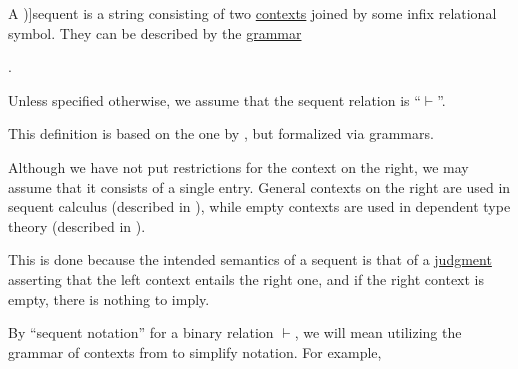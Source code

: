 \begin{definition}\label{def:sequent}\mimprovised
  A \term[ru=секвенция (\cite[49]{Герасимов2011})]{sequent} is a string consisting of two \hyperref[def:logical_context]{contexts} joined by some infix relational symbol. They can be described by the \hyperref[def:formal_grammar]{grammar}
  \begin{bnf*}
     { \bnfsp {} \bnfsp {}}.
  \end{bnf*}

  Unless specified otherwise, we assume that the sequent relation is \enquote{\( \vdash \)}.
\end{definition}
\begin{comments}
  \item This definition is based on the one by , but formalized via grammars.
  \item Although we have not put restrictions for the context on the right, we may assume that it consists of a single entry. General contexts on the right are used in sequent calculus (described in \cite[sec. 2.6]{Mimram2020}), while empty contexts are used in dependent type theory (described in \cite[ch. 8]{Mimram2020}).

  This is done because the intended semantics of a sequent is that of a \hyperref[con:judgment]{judgment} asserting that the left context entails the right one, and if the right context is empty, there is nothing to imply.
\end{comments}

\begin{remark}\label{rem:sequent_notation}
  By \enquote{sequent notation} for a binary relation \( \vdash \), we will mean utilizing the grammar of contexts from  to simplify notation. For example,
\end{remark}


